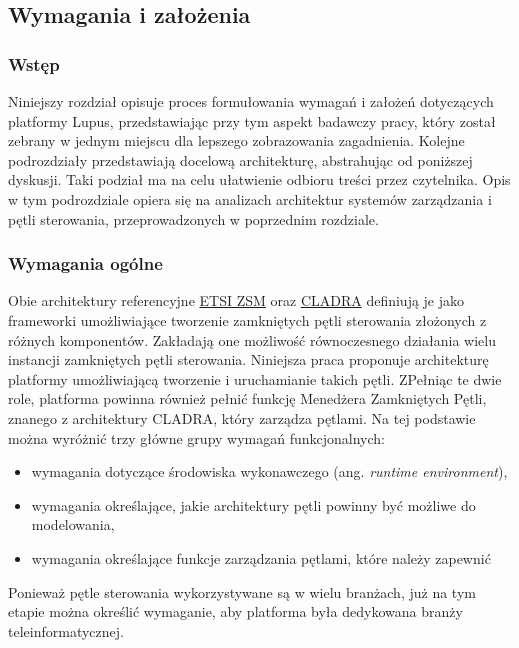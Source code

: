 \subsection{Wymagania i założenia}\label{sec:32}

\subsubsection{Wstęp}

Niniejszy rozdział opisuje proces formułowania wymagań i założeń dotyczących platformy Lupus, przedstawiając przy tym aspekt badawczy pracy, który został zebrany w jednym miejscu dla lepszego zobrazowania zagadnienia. Kolejne podrozdziały przedstawiają docelową architekturę, abstrahując od poniższej dyskusji. Taki podział ma na celu ułatwienie odbioru treści przez czytelnika. Opis w tym podrozdziale opiera się na analizach architektur systemów zarządzania i pętli sterowania, przeprowadzonych w poprzednim rozdziale.

\subsubsection{Wymagania ogólne}

Obie architektury referencyjne \hyperlink{sec:zsm}{ETSI ZSM} oraz \hyperlink{sec:cladra}{CLADRA} definiują je jako frameworki umożliwiające tworzenie zamkniętych pętli sterowania złożonych z różnych komponentów. Zakładają one możliwość równoczesnego działania wielu instancji zamkniętych pętli sterowania. Niniejsza praca proponuje architekturę platformy umożliwiającą tworzenie i uruchamianie takich pętli. ZPełniąc te dwie role, platforma powinna również pełnić funkcję Menedżera Zamkniętych Pętli, znanego z architektury CLADRA, który zarządza pętlami. Na tej podstawie można wyróżnić trzy główne grupy wymagań funkcjonalnych:
\begin{itemize}
    \item wymagania dotyczące środowiska wykonawczego (ang. \textit{runtime environment}), 
    \item wymagania określające, jakie architektury pętli powinny być możliwe do modelowania,
    \item wymagania określające funkcje zarządzania pętlami, które należy zapewnić
\end{itemize}

Ponieważ pętle sterowania wykorzystywane są w wielu branżach, już na tym etapie można określić wymaganie, aby platforma była dedykowana branży teleinformatycznej.


